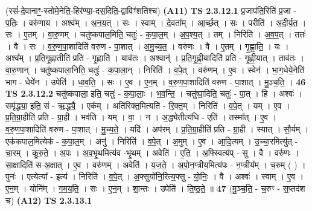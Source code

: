 \documentclass[17pt]{extarticle}
\begin{document}
                  \newline
                      (रसं॑-दे॒वानाꣳ॒॒-स्तोमे॒नेति॒-हिर॑ण्या॒-दस॒दिति॒-द्वाविꣳ॑शतिश्च) \textbf{(A11)} \newline \newline
                                \textbf{ TS 2.3.12.1} \newline
                  प्र॒जाप॑ति॒रिति॑ प्र॒जा - प॒तिः॒ । वरु॑णाय । अश्व᳚म् । अ॒न॒य॒त् । सः । स्वाम् । दे॒वता᳚म् । आ॒र्च्छ॒त् । सः । परीति॑ । अ॒दी॒र्य॒त॒ । सः । ए॒तम् । वा॒रु॒णम् । चतु॑ष्कपाल॒मिति॒ चतुः॑ - क॒पा॒ल॒म् । अ॒प॒श्य॒त् । तम् । निरिति॑ । अ॒व॒प॒त् । ततः॑ । वै । सः । व॒रु॒ण॒पा॒शादिति॑ वरुण - पा॒शात् । अ॒मु॒च्य॒त॒ । वरु॑णः । वै । ए॒तम् । गृ॒ह्णा॒ति॒ । यः । अश्व᳚म् । प्र॒ति॒गृ॒ह्णातीति॑ प्रति - गृ॒ह्णाति॑ । याव॑तः । अश्वान्॑ । प्र॒ति॒गृ॒ह्णी॒यादिति॑ प्रति - गृ॒ह्णी॒यात् । ताव॑तः । वा॒रु॒णान् । चतु॑ष्कपाला॒निति॒ चतुः॑ - क॒पा॒ला॒न् । निरिति॑ । व॒पे॒त् । वरु॑णम् । ए॒व । स्वेन॑ । भा॒ग॒धेये॒नेति॑ भाग - धेये॑न । उपेति॑ । धा॒व॒ति॒ । सः । ए॒व । ए॒न॒म् । व॒रु॒ण॒पा॒शादिति॑ वरुण - पा॒शात् । मु॒ञ्च॒ति॒ । \textbf{  46} \newline
                  \newline
                                \textbf{ TS 2.3.12.2} \newline
                  चतु॑ष्कपाला॒ इति॒ चतुः॑ - क॒पा॒लाः॒ । भ॒व॒न्ति॒ । चतु॑ष्पा॒दिति॒ चतुः॑ - पा॒त् । हि । अश्वः॑ । समृ॑द्ध्या॒ इति॒ सं - ऋ॒द्ध्यै॒ । एक᳚म् । अति॑रिक्त॒मित्यति॑ - रि॒क्त॒म् । निरिति॑ । व॒पे॒त् । यम् । ए॒व । प्र॒ति॒ग्रा॒हीति॑ प्रति - ग्रा॒ही । भव॑ति । यम् । वा॒ । न । अ॒द्ध्येतीत्य॑धि - एति॑ । तस्मा᳚त् । ए॒व । व॒रु॒ण॒पा॒शादिति॑ वरुण - पा॒शात् ।   मु॒च्य॒ते॒ । यदि॑ । अप॑रम् । प्र॒ति॒ग्रा॒हीति॑ प्रति -  ग्रा॒ही । स्यात् । सौ॒र्यम् । एक॑कपाल॒मित्येक॑ - क॒पा॒ल॒म् । अनु॑ । निरिति॑ । व॒पे॒त् । अ॒मुम् । ए॒व । आ॒दि॒त्यम् । उ॒च्चा॒रमित्यु॑त् - चा॒रम् । कु॒रु॒ते॒ । अ॒पः । अ॒व॒भृ॒थमित्य॑व -भृ॒थम् । अवेति॑ । ए॒ति॒ । अ॒फ्स्वित्य॑प् - सु । वै । वरु॑णः । सा॒क्षादिति॑ स-अ॒क्षात् । ए॒व । वरु॑णम् । अवेति॑ । य॒ज॒ते॒ । अ॒पो॒न॒प्त्रीय॒मित्य॑पः - न॒प्त्रीय᳚म् । च॒रुम् ( ) । पुनः॑ । एत्येत्या᳚ - इत्य॑ । निरिति॑ । व॒पे॒त् । अ॒फ्सुयो॑नि॒रित्य॒फ्सु - यो॒निः॒ । वै । अश्वः॑ । स्वाम् । ए॒व । ए॒न॒म् । योनि᳚म् । ग॒म॒य॒ति॒ । सः । ए॒न॒म् । शा॒न्तः । उपेति॑ । ति॒ष्ठ॒ते॒ ॥ \textbf{  47 } \newline
                  \newline
                      (मु॒ञ्च॒ति॒ - च॒रुꣳ - स॒प्तद॑श च)  \textbf{(A12)} \newline \newline
                                \textbf{ TS 2.3.13.1} \newline
\end{document}
